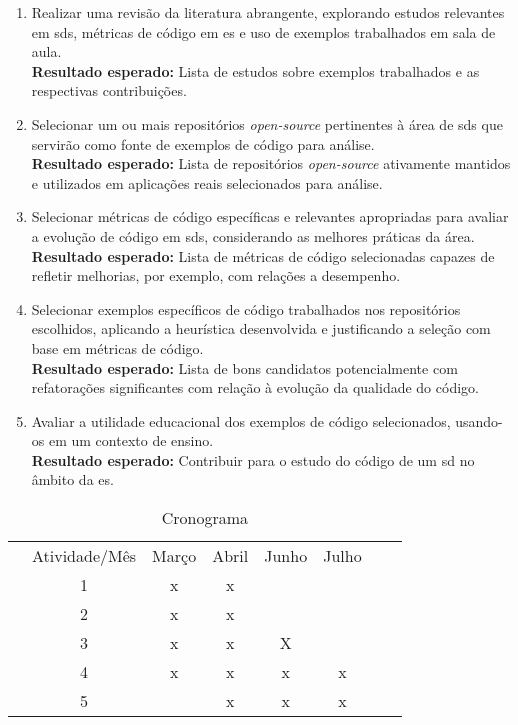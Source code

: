 \begin{itemize}
\begin{enumerate}
    \item Realizar uma revisão da literatura abrangente, explorando estudos relevantes em \gls{sds}, métricas de código em \gls{es} e uso de exemplos trabalhados em sala de aula.
    \\\textbf{Resultado esperado:} Lista de estudos sobre exemplos trabalhados e as respectivas contribuições.

    \item Selecionar um ou mais repositórios \textit{open-source} pertinentes à área de \gls{sds} que servirão como fonte de exemplos de código para análise.
    \\\textbf{Resultado esperado:} Lista de repositórios \textit{open-source} ativamente mantidos e utilizados em aplicações reais selecionados para análise.

    \item Selecionar métricas de código específicas e relevantes apropriadas para avaliar a evolução de código em \gls{sds}, considerando as melhores práticas da área.
    \\\textbf{Resultado esperado:} Lista de métricas de código selecionadas capazes de refletir melhorias, por exemplo, com relações a desempenho.

    \item Selecionar exemplos específicos de código trabalhados nos repositórios escolhidos, aplicando a heurística desenvolvida e justificando a seleção com base em métricas de código.
    \\\textbf{Resultado esperado:} Lista de bons candidatos potencialmente com refatorações significantes com relação à evolução da qualidade do código.

    \item Avaliar a utilidade educacional dos exemplos de código selecionados, usando-os em um contexto de ensino.
    \\\textbf{Resultado esperado:} Contribuir para o estudo do código de um \gls{sd} no âmbito da \gls{es}.
\end{enumerate}
\end{itemize}

\begin{table}
\centering
\caption{Cronograma}
\begin{tabular}{cccccccc}
\cline{1-1}
\multicolumn{1}{|l|}{} & Atividade/Mês & Março & Abril & Junho & Julho  \\ \cline{1-1}
                       & 1 & x & x &  & \\
                       & 2 & x & x &  & \\
                       & 3 & x & x & X & \\
                       & 4 & x & x & x & x \\
                       & 5 &  & x & x & x
\end{tabular}
\end{table}
